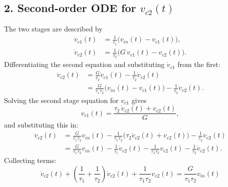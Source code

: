 \documentclass[12pt]{article}
\begin{document}
\subsection*{2. Second-order ODE for $v_{c2}(t)$}
The two stages are described by
\begin{align*}
\dot v_{c1}(t) &= \frac{1}{\tau_1}\big(v_{in}(t) - v_{c1}(t)\big), \\
\dot v_{c2}(t) &= \frac{1}{\tau_2}\big(G\,v_{c1}(t) - v_{c2}(t)\big).
\end{align*}
Differentiating the second equation and substituting $\dot v_{c1}$ from the first:
\begin{align*}
\ddot v_{c2}(t) &= \frac{G}{\tau_2}\dot v_{c1}(t) - \frac{1}{\tau_2}\dot v_{c2}(t) \\
&= \frac{G}{\tau_1\tau_2}\big(v_{in}(t) - v_{c1}(t)\big) - \frac{1}{\tau_2}\dot v_{c2}(t).
\end{align*}
Solving the second stage equation for $v_{c1}$ gives
\[
v_{c1}(t) = \frac{\tau_2\,\dot v_{c2}(t) + v_{c2}(t)}{G},
\]
and substituting this in:
\begin{align*}
\ddot v_{c2}(t) &= \frac{G}{\tau_1\tau_2}v_{in}(t) - \frac{1}{\tau_1\tau_2}\big(\tau_2\dot v_{c2}(t) + v_{c2}(t)\big) - \frac{1}{\tau_2}\dot v_{c2}(t) \\
&= \frac{G}{\tau_1\tau_2}v_{in}(t) - \frac{1}{\tau_1}\dot v_{c2}(t) - \frac{1}{\tau_1\tau_2}v_{c2}(t) - \frac{1}{\tau_2}\dot v_{c2}(t).
\end{align*}
Collecting terms:
\[
\boxed{\ddot v_{c2}(t) + \left(\frac{1}{\tau_1} + \frac{1}{\tau_2}\right)\dot v_{c2}(t) + \frac{1}{\tau_1\tau_2}v_{c2}(t) = \frac{G}{\tau_1\tau_2}v_{in}(t)}
\]
\end{document}
